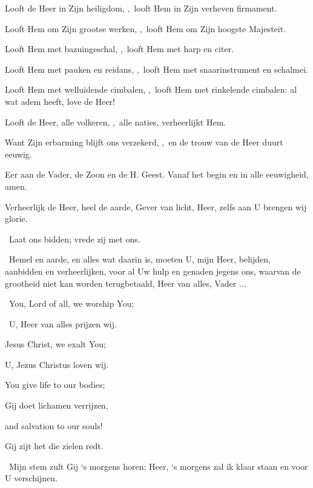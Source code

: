 \documentclass[12pt,twoside,a5paper]{article}
\begin{document}
\begin{halfparskip}
   Looft de Heer in Zijn heiligdom, \sep\ looft Hem in Zijn verheven firmament.

  Looft Hem om Zijn grootse werken, \sep\ looft Hem om Zijn hoogste Majesteit.

  Looft Hem met bazuingeschal, \sep\ looft Hem met harp en citer.

  Looft Hem met pauken en reidans, \sep\ looft Hem met snaarinstrument en schalmei.

  Looft Hem met welluidende cimbalen, \sep\ looft Hem met rinkelende cimbalen: al wat adem heeft, love de Heer!
\end{halfparskip}

\begin{halfparskip}
   Looft de Heer, alle volkeren, \sep\ alle naties, verheerlijkt Hem.

  Want Zijn erbarming blijft ons verzekerd, \sep\ en de trouw van de Heer duurt eeuwig.

  Eer aan de Vader, de Zoon en de H. Geest. Vanaf het begin en in alle eeuwigheid, amen.

  Verheerlijk de Heer, heel de aarde, Gever van licht, Heer, zelfs aan U brengen wij glorie.
\end{halfparskip}

\dd\ Laat ons bidden; vrede zij met ons.

\cc\ Hemel en aarde, en alles wat daarin is, moeten U, mijn Heer, belijden, aanbidden en verheerlijken, voor al Uw hulp en genaden jegens ons, waarvan de grootheid niet kan worden terugbetaald, Heer van alles, Vader ...

\begin{doublecols}
  \englishl \rr\ You, Lord of all, we worship You;

   \rr\ U, Heer van alles prijzen wij.

  \englishl Jesus Christ, we exalt You;

   U, Jezus Christus loven wij.

  \englishl You give life to our bodies;

   Gij doet lichamen verrijzen,

  \englishl and salvation to our souls!

   Gij zijt het die zielen redt.
\end{doublecols}

\dd\ Mijn stem zult Gij `s morgens horen; Heer, `s morgens zal ik klaar staan en voor U verschijnen.
\end{document}
